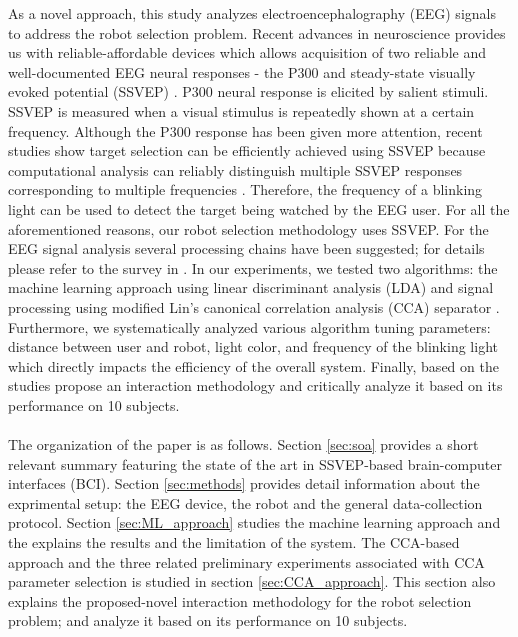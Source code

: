 \documentclass{svmult}
\begin{document}
As a novel approach, this study analyzes electroencephalography (EEG) signals to address the robot selection problem. Recent advances in neuroscience provides us with reliable-affordable devices which allows acquisition of two reliable and well-documented EEG neural responses - the P300 and steady-state visually evoked potential (SSVEP) \cite{Zhu2010, Bi2013, Beverina2003}. 
P300 neural response is elicited by salient stimuli. SSVEP is measured when a visual stimulus is repeatedly shown at a certain frequency. Although the P300 response has been given more attention, recent studies show target selection can be efficiently achieved using SSVEP because computational analysis can reliably distinguish multiple SSVEP responses corresponding to multiple frequencies \cite{SSVEPfiability}. 
Therefore, the frequency of a blinking light can be used to detect the target being watched by the EEG user. For all the aforementioned reasons, our robot selection methodology uses SSVEP. 
For the EEG signal analysis several processing chains have been suggested; for details please refer to the survey in \cite{Bi2013}. 
In our experiments, we tested two algorithms: the machine learning approach using linear discriminant analysis (LDA) \cite{openvibeSSVEP} and signal processing using modified Lin's canonical correlation analysis (CCA) separator \cite{Lin2014}. 
Furthermore, we systematically analyzed various algorithm tuning parameters: distance between user and robot, light color, and frequency of the blinking light which directly impacts the efficiency of the overall system. Finally, based on the studies propose an interaction methodology and critically analyze it based on its performance on 10 subjects.\\
\\
The organization of the paper is as follows. Section \ref{sec:soa} provides a short relevant summary featuring the state of the art in SSVEP-based brain-computer interfaces (BCI). Section \ref{sec:methods} provides detail information about the exprimental setup: the EEG device, the robot and the general data-collection protocol. Section \ref{sec:ML_approach} studies the machine learning approach and the explains the results and the limitation of the system. The CCA-based approach and the three related preliminary experiments associated with CCA parameter selection is studied in section \ref{sec:CCA_approach}. This section also explains the proposed-novel interaction methodology for the robot selection problem; and analyze it based on its performance on 10 subjects. 
\end{document}
